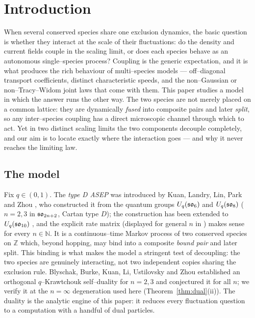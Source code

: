\documentclass[11pt]{article}
\theoremstyle{plain}
\theoremstyle{definition}
\theoremstyle{remark}
\newcommand{\Z}{\mathbb{Z}}\newcommand{\R}{\mathbb{R}}\newcommand{\N}{\mathbb{N}}
\begin{document}
{\small\tableofcontents}

\section{Introduction}\label{sec:intro}

When several conserved species share one exclusion dynamics, the basic question is
whether they interact at the scale of their fluctuations: do the density and current
fields couple in the scaling limit, or does each species behave as an autonomous
single--species process? Coupling is the generic expectation, and it is what produces
the rich behaviour of multi--species models --- off--diagonal transport coefficients,
distinct characteristic speeds, and the non--Gaussian or non--Tracy--Widom joint laws
that come with them. This paper studies a model in which the answer runs the other way.
The two species are not merely placed on a common lattice: they are dynamically
\emph{fused} into composite pairs and later \emph{split}, so any inter--species
coupling has a direct microscopic channel through which to act. Yet in two distinct
scaling limits the two components decouple completely, and our aim is to locate exactly
where the interaction goes --- and why it never reaches the limiting law.

\subsection{The model}\label{sec:intromodel}
Fix $q\in(0,1)$. The \emph{type D ASEP} was introduced by Kuan, Landry, Lin, Park and
Zhou \cite{KLLPZ}, who constructed it from the quantum groups $U_q(\mathfrak{so}_6)$ and
$U_q(\mathfrak{so}_8)$ ($n=2,3$ in $\mathfrak{so}_{2n+2}$, Cartan type $D$); the construction has been
extended to $U_q(\mathfrak{so}_{10})$ \cite{RSL}, and the explicit rate matrix (displayed for
general $n$ in \cite[\S2.1]{REU}) makes sense for every $n\in\N$. It is a
continuous--time Markov process of two conserved species on $\Z$ which, beyond
hopping, may bind into a composite \emph{bound pair} and later split. This binding is
what makes the model a stringent test of decoupling: the two species are genuinely
interacting, not two independent copies sharing the exclusion rule. Blyschak, Burke,
Kuan, Li, Ustilovsky and Zhou \cite{REU} established an orthogonal $q$--Krawtchouk
self--duality for $n=2,3$ and conjectured it for all $n$; we verify it at the
$n=\infty$ degeneration used here (Theorem~\ref{thm:dual}(ii)). The duality is the
analytic engine of this paper: it reduces every fluctuation question to a computation
with a handful of dual particles.
\end{document}
